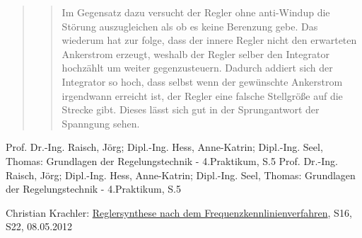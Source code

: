 \begin{quote}
\begin{quote}
        Im Gegensatz dazu versucht der Regler ohne anti-Windup die Störung auszugleichen als ob es keine
        Berenzung gebe. Das wiederum hat zur folge, dass der innere Regler nicht den erwarteten Ankerstrom erzeugt,
        weshalb der Regler selber den Integrator hochzählt um weiter gegenzusteuern. Dadurch addiert sich der
        Integrator so hoch, dass selbst wenn der gewünschte Ankerstrom irgendwann erreicht ist, der Regler eine
        falsche Stellgröße auf die Strecke gibt. Dieses lässt sich gut in der Sprungantwort der Spanngung sehen. 
                
    \end{quote}


    
    
    
    
\end{quote}




%     
%         

\begin{thebibliography}{999}
 Prof. Dr.-Ing. Raisch, Jörg; Dipl.-Ing. Hess, Anne-Katrin; Dipl.-Ing. Seel, Thomas:
Grundlagen der Regelungstechnik - 4.Praktikum, S.5
 Prof. Dr.-Ing. Raisch, Jörg; Dipl.-Ing. Hess, Anne-Katrin; Dipl.-Ing. Seel, Thomas:
Grundlagen der Regelungstechnik - 4.Praktikum, S.5



Christian Krachler:
\href{http://www.krachler.com/fileadmin/user_upload/arbeiten/Reglersynthese_Christian_Krachler.pdf}{Reglersynthese nach dem Frequenzkennlinienverfahren}, S16, S22, 08.05.2012



\end{thebibliography}



